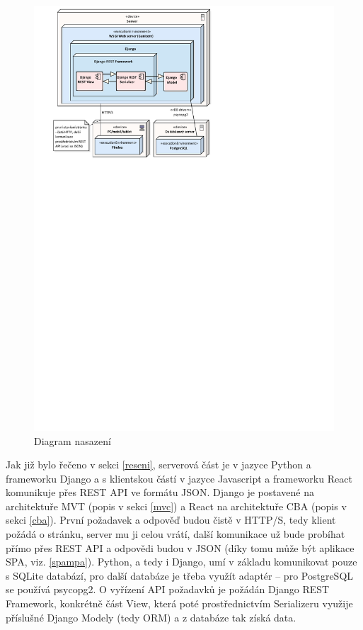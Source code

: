     \begin{figure}[ht]\centering
    	\includegraphics[width=1\textwidth]{img/deployment-diagram}
    	\caption[Diagram nasazení]{Diagram nasazení}\label{fig:deployment-diagram}
    \end{figure}
    
    Jak již bylo řečeno v sekci \ref{reseni}, serverová část je v jazyce Python a frameworku Django a s klientskou částí v jazyce Javascript a frameworku React komunikuje přes REST API ve formátu JSON. Django je postavené na architektuře MVT (popis v sekci \ref{mvc}) a React na architektuře CBA (popis v sekci \ref{cba}). První požadavek a odpověď budou čistě v HTTP/S, tedy klient požádá o stránku, server mu ji celou vrátí, další komunikace už bude probíhat přímo přes REST API a odpovědi budou v JSON (díky tomu může být aplikace SPA, viz. \ref{spampa}). Python, a tedy i Django, umí v základu komunikovat pouze s SQLite databází, pro další databáze je třeba využít adaptér -- pro PostgreSQL se používá psycopg2. O vyřízení API požadavků je požádán Django REST Framework, konkrétně část View, která poté prostřednictvím Serializeru využije příslušné Django Modely (tedy ORM) a z databáze tak získá data.
    
